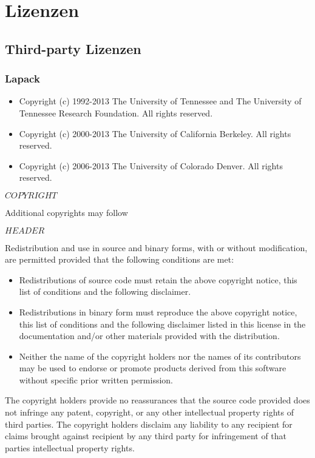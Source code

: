 \chapter{Lizenzen}

\section{Third-party Lizenzen}

\subsection{Lapack}

\begin{itemize}
  \item Copyright (c) 1992-2013 The University of Tennessee and The University of Tennessee Research Foundation. All rights reserved.
  \item Copyright (c) 2000-2013 The University of California Berkeley. All rights reserved.
  \item Copyright (c) 2006-2013 The University of Colorado Denver.  All rights reserved.
\end{itemize}

$COPYRIGHT$

Additional copyrights may follow

$HEADER$

Redistribution and use in source and binary forms, with or without
modification, are permitted provided that the following conditions are
met:
\begin{itemize}
 \item Redistributions of source code must retain the above copyright notice, this list of conditions and the following disclaimer.

 \item Redistributions in binary form must reproduce the above copyright notice, this list of conditions and the following disclaimer listed in this license in the documentation and/or other materials provided with the distribution.

 \item Neither the name of the copyright holders nor the names of its contributors may be used to endorse or promote products derived from this software without specific prior written permission.
\end{itemize}
The copyright holders provide no reassurances that the source code
provided does not infringe any patent, copyright, or any other
intellectual property rights of third parties.  The copyright holders
disclaim any liability to any recipient for claims brought against
recipient by any third party for infringement of that parties
intellectual property rights.

